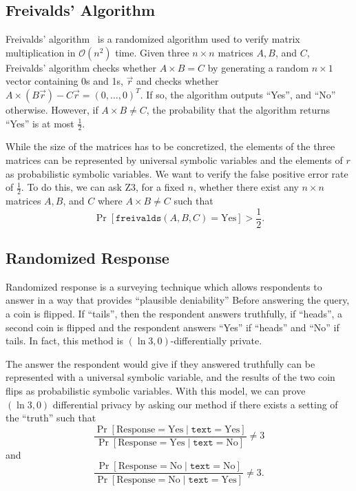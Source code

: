 \documentclass[acmsmall,review]{acmart}\settopmatter{}
\begin{document}
	\subsection{Freivalds' Algorithm}
	\label{sec:freivalds}
	
	Freivalds' algorithm~\cite{freivalds1977} is a randomized algorithm used to verify matrix multiplication in $\mathcal{O}(n^2)$ time.
	Given three $n \times n$ matrices $A,B$, and $C$, Freivalds' algorithm checks whether $A \times B = C$ by generating a random $n \times 1$ vector containing 0s and 1s, $\vec{r}$ and checks whether $A \times (B\vec{r}) - C\vec{r} = (0,\ldots,0)^T$.
	If so, the algorithm outputs ``Yes'', and ``No'' otherwise.
	However, if $A \times B \neq C$, the probability that the algorithm returns ``Yes'' is at most $\frac{1}{2}$.
	
	
	While the size of the matrices has to be concretized, the elements of the three matrices can be represented by universal symbolic variables and the elements of $r$ as probabilistic symbolic variables.
	We want to verify the false positive error rate of $\frac{1}{2}$.
	To do this, we can ask Z3, for a fixed $n$, whether there exist any $n \times n$ matrices $A,B$, and $C$ where $A \times B \neq C$ such that
	\[
	\Pr[\mathtt{freivalds}(A,B,C) = \text{Yes}] > \frac{1}{2}.
	\]
	
	\subsection{Randomized Response}
	\label{sec:randomized_response}
	
	Randomized response is a surveying technique which allows respondents to answer in a way that provides ``plausible deniability''
	Before answering the query, a coin is flipped.
	If ``tails'', then the respondent answers truthfully, if ``heads'', a second coin is flipped and the respondent answers ``Yes'' if ``heads'' and ``No'' if tails.
	In fact, this method is $(\ln 3, 0)$-differentially private.
	
	
	The answer the respondent would give if they answered truthfully can be represented with a universal symbolic variable, and the results of the two coin flips as probabilistic symbolic variables.
	With this model, we can prove $(\ln 3, 0)$ differential privacy by asking our method if there exists a setting of the ``truth'' such that
	\[
	\frac{\Pr[\text{Response} = \text{Yes} \mid \mathtt{text} = \text{Yes}]}{\Pr[\text{Response} = \text{Yes} \mid \mathtt{text} = \text{No}]} \neq 3
	\]
	and
	\[
	\frac{\Pr[\text{Response} = \text{No} \mid \mathtt{text} = \text{No}]}{\Pr[\text{Response} = \text{No} \mid \mathtt{text} = \text{Yes}]} \neq 3.
	\]
	
\end{document}
